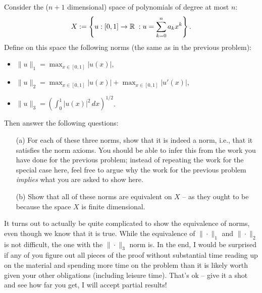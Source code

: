 \documentclass[12pt]{memoir}
\begin{document}
\begin{Ej}
    Consider the ($n+1$ dimensional) space of polynomials of degree at most $n$:
\begin{align*}
  X := \left\{ 
   u : [0,1] \rightarrow \mathbb{R} \; :
   u=\sum_{k=0}^n a_k x^k
  \right\}.
\end{align*}
Define on this space the following norms (the same as in the previous problem):
\begin{itemize}
\item $\|u\|_1 = \max_{x \in [0,1]} |u(x)|$,
\item $\|u\|_2 = \max_{x \in [0,1]} |u(x)| + \max_{x \in [0,1]}
  |u'(x)|$,
\item $\|u\|_3 = \left(\int_0^1 |u(x)|^2 \, dx\right)^{1/2}$.
\end{itemize}
Then answer the following questions:
\begin{itemize}
\item[(a)] For each of these three norms, show that it is indeed a
  norm, i.e., that it satisfies the norm axioms. You should be able to
  infer this from the work you have done for the previous problem;
  instead of repeating the work for the special case here, feel free
  to argue why the work for the previous problem \textit{implies} what you are
  asked to show here.
\item[(b)] Show that all of these norms are equivalent on $X$ -- as they
  ought to be because the space $X$ is finite dimensional.
\end{itemize}
\end{Ej}
\begin{nonum-Rmk}
    It turns out to actually be quite complicated to
  show the equivalence of norms, even though we know that it is true. While the equivalence of
  $\|\cdot\|_1$ and  $\|\cdot\|_2$ is not difficult, the one with the
  $\|\cdot\|_3$ norm is. In the end, I would be surprised if any of you figure
  out all pieces of the proof without substantial time reading up on
  the material and spending more time on the problem than it is likely
  worth given your other obligations (including leisure time). That's
  ok -- give it a shot and see how far you get, I will accept partial results!
\end{nonum-Rmk}
\end{document}
